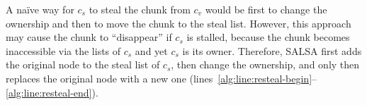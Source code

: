 A na\"{i}ve way for $c_s$ to steal the chunk from $c_v$ would be first to change the ownership and then to move the chunk to the steal list. However, this approach may cause the chunk to ``disappear'' if $c_s$ is stalled, because the chunk becomes inaccessible via the lists of $c_s$ and yet $c_s$ is its owner. 
Therefore, SALSA first adds the original node to the steal list of $c_s$, then change the ownership, and only then replaces the original node with a new one (lines~\ref{alg:line:resteal-begin}--\ref{alg:line:resteal-end}).